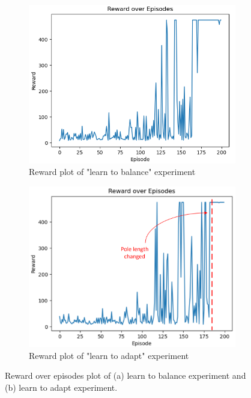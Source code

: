 \documentclass[10pt,a4paper]{article}
\begin{document}
\begin{figure}[H]
	\centering
	\begin{subfigure}[b]{0.48\textwidth}
		\centering
		\includegraphics[width=1\linewidth]{figure/200_iterations}
		\caption{Reward plot of "learn to balance" experiment}
		\label{fig:reward_1}
	\end{subfigure}
	\hfill
	\begin{subfigure}[b]{0.48\textwidth}
		\centering
		\includegraphics[width=1\linewidth]{figure/pole_changed}
		\caption{Reward plot of "learn to adapt" experiment}
		\label{fig:reward_2}
	\end{subfigure}
	\caption{Reward over episodes plot of (a) learn to balance experiment and (b) learn to adapt experiment. }
	\label{fig:reward}
\end{figure}
\end{document}
